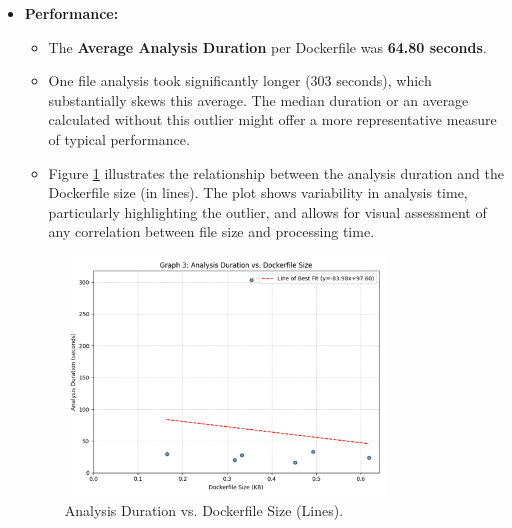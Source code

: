 \begin{itemize}


     \item \textbf{Performance:}
        \begin{itemize}
            \item The \textbf{Average Analysis Duration} per Dockerfile was \textbf{64.80 seconds}. 
            \item One file analysis took significantly longer (303 seconds), which substantially skews this average. The median duration or an average calculated without this outlier might offer a more representative measure of typical performance.
            \item Figure \ref{fig:time_corr} illustrates the relationship between the analysis duration and the Dockerfile size (in lines). The plot shows variability in analysis time, particularly highlighting the outlier, and allows for visual assessment of any correlation between file size and processing time. %
        \end{itemize}
         \begin{figure}[ht]
            \centering
            \includegraphics[width=0.8\textwidth]{Figures/Picture3_size.png} 
            \caption{Analysis Duration vs. Dockerfile Size (Lines).}
            \label{fig:time_corr}
        \end{figure}

\end{itemize}

